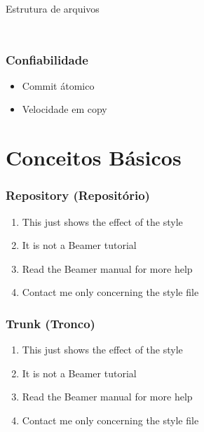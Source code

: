 \documentclass{beamer}
\begin{document}
\begin{frame}
\begin{columns}
\begin{column}{.5\textwidth}
\begin{block}{Estrutura de arquivos}
\begin{columns}
\begin{column}{.5\textwidth}
\begin{figure}
                    \end{figure}
                \end{column}
            \end{columns}
        \end{block}

    \end{column}

\end{columns}

\end{frame}

\begin{frame}
    \frametitle{Confiabilidade}
    \begin{itemize}
        \item Commit \'atomico
        \item Velocidade em copy
    \end{itemize}
\end{frame}

\section{Conceitos B\'asicos}

\begin{frame}
    \frametitle{Repository (Reposit\'orio)}

    \begin{enumerate}
        \item This just shows the effect of the style
        \item It is not a Beamer tutorial
        \item Read the Beamer manual for more help
        \item Contact me only concerning the style file
    \end{enumerate}
\end{frame}

\begin{frame}
    \frametitle{Trunk (Tronco)}

    \begin{enumerate}
        \item This just shows the effect of the style
        \item It is not a Beamer tutorial
        \item Read the Beamer manual for more help
        \item Contact me only concerning the style file
    \end{enumerate}
\end{frame}
\end{document}
